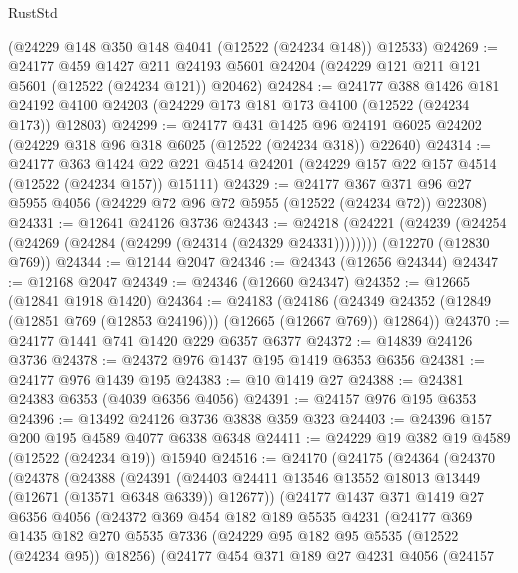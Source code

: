 \begin{lexlean}{RustStd}
\begin{coremodule}
    (@24229 @148 @350 @148 @4041 (@12522 (@24234 @148)) @12533)
@24269 := @24177
    @459
    @1427
    @211
    @24193
    @5601
    @24204
    (@24229 @121 @211 @121 @5601 (@12522 (@24234 @121)) @20462)
@24284 := @24177
    @388
    @1426
    @181
    @24192
    @4100
    @24203
    (@24229 @173 @181 @173 @4100 (@12522 (@24234 @173)) @12803)
@24299 := @24177
    @431
    @1425
    @96
    @24191
    @6025
    @24202
    (@24229 @318 @96 @318 @6025 (@12522 (@24234 @318)) @22640)
@24314 := @24177
    @363
    @1424
    @22
    @221
    @4514
    @24201
    (@24229 @157 @22 @157 @4514 (@12522 (@24234 @157)) @15111)
@24329 := @24177
    @367
    @371
    @96
    @27
    @5955
    @4056
    (@24229 @72 @96 @72 @5955 (@12522 (@24234 @72)) @22308)
@24331 := @12641 @24126 @3736
@24343 := @24218
    (@24221 (@24239 (@24254 (@24269 (@24284 (@24299 (@24314 (@24329 @24331))))))))
    (@12270 (@12830 @769))
@24344 := @12144 @2047
@24346 := @24343 (@12656 @24344)
@24347 := @12168 @2047
@24349 := @24346 (@12660 @24347)
@24352 := @12665 (@12841 @1918 @1420)
@24364 := @24183
    (@24186 (@24349 @24352 (@12849 (@12851 @769 (@12853 @24196))) (@12665 (@12667 @769)) @12864))
@24370 := @24177 @1441 @741 @1420 @229 @6357 @6377
@24372 := @14839 @24126 @3736
@24378 := @24372 @976 @1437 @195 @1419 @6353 @6356
@24381 := @24177 @976 @1439 @195
@24383 := @10 @1419 @27
@24388 := @24381 @24383 @6353 (@4039 @6356 @4056)
@24391 := @24157 @976 @195 @6353
@24396 := @13492 @24126 @3736 @3838 @359 @323
@24403 := @24396 @157 @200 @195 @4589 @4077 @6338 @6348
@24411 := @24229 @19 @382 @19 @4589 (@12522 (@24234 @19)) @15940
@24516 := @24170
    (@24175
      (@24364
        (@24370
          (@24378
            (@24388
              (@24391
                (@24403 @24411 @13546 @13552 @18013 @13449 (@12671 (@13571 @6348 @6339)) @12677))
              (@24177
                @1437
                @371
                @1419
                @27
                @6356
                @4056
                (@24372
                  @369
                  @454
                  @182
                  @189
                  @5535
                  @4231
                  (@24177
                    @369
                    @1435
                    @182
                    @270
                    @5535
                    @7336
                    (@24229 @95 @182 @95 @5535 (@12522 (@24234 @95)) @18256)
                    (@24177
                      @454
                      @371
                      @189
                      @27
                      @4231
                      @4056
                      (@24157

\end{coremodule}
\end{lexlean}
